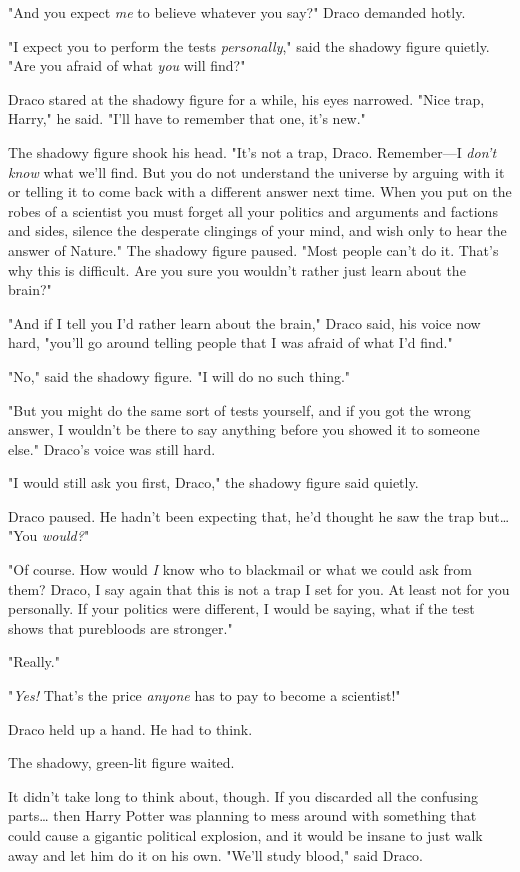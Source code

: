 "And you expect \emph{me} to believe whatever you say?" Draco demanded hotly.

"I expect you to perform the tests \emph{personally}," said the shadowy figure
quietly. "Are you afraid of what \emph{you} will find?"

Draco stared at the shadowy figure for a while, his eyes narrowed. "Nice trap,
Harry," he said. "I'll have to remember that one, it's new."

The shadowy figure shook his head. "It's not a trap, Draco. Remember---I
\emph{don't know} what we'll find. But you do not understand the universe by
arguing with it or telling it to come back with a different answer next time.
When you put on the robes of a scientist you must forget all your politics and
arguments and factions and sides, silence the desperate clingings of your mind,
and wish only to hear the answer of Nature." The shadowy figure paused. "Most
people can't do it. That's why this is difficult. Are you sure you wouldn't
rather just learn about the brain?"

"And if I tell you I'd rather learn about the brain," Draco said, his voice now
hard, "you'll go around telling people that I was afraid of what I'd find."

"No," said the shadowy figure. "I will do no such thing."

"But you might do the same sort of tests yourself, and if you got the wrong
answer, I wouldn't be there to say anything before you showed it to someone
else." Draco's voice was still hard.

"I would still ask you first, Draco," the shadowy figure said quietly.

Draco paused. He hadn't been expecting that, he'd thought he saw the trap
but{\ldots} "You \emph{would?}"

"Of course. How would \emph{I} know who to blackmail or what we could ask from
them? Draco, I say again that this is not a trap I set for you. At least not
for you personally. If your politics were different, I would be saying, what if
the test shows that purebloods are stronger."

"Really."

"\emph{Yes!} That's the price \emph{anyone} has to pay to become a scientist!"

Draco held up a hand. He had to think.

The shadowy, green-lit figure waited.

It didn't take long to think about, though. If you discarded all the confusing
parts{\ldots} then Harry Potter was planning to mess around with something that
could cause a gigantic political explosion, and it would be insane to just walk
away and let him do it on his own. "We'll study blood," said Draco.

